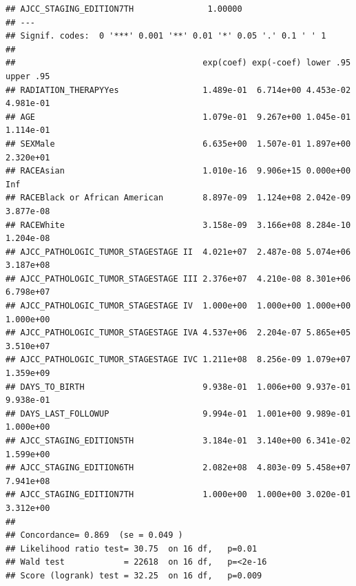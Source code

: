 \documentclass[
  11pt,
]{article}
\begin{document}
\begin{verbatim}
## AJCC_STAGING_EDITION7TH               1.00000    
## ---
## Signif. codes:  0 '***' 0.001 '**' 0.01 '*' 0.05 '.' 0.1 ' ' 1
## 
##                                      exp(coef) exp(-coef) lower .95 upper .95
## RADIATION_THERAPYYes                 1.489e-01  6.714e+00 4.453e-02 4.981e-01
## AGE                                  1.079e-01  9.267e+00 1.045e-01 1.114e-01
## SEXMale                              6.635e+00  1.507e-01 1.897e+00 2.320e+01
## RACEAsian                            1.010e-16  9.906e+15 0.000e+00       Inf
## RACEBlack or African American        8.897e-09  1.124e+08 2.042e-09 3.877e-08
## RACEWhite                            3.158e-09  3.166e+08 8.284e-10 1.204e-08
## AJCC_PATHOLOGIC_TUMOR_STAGESTAGE II  4.021e+07  2.487e-08 5.074e+06 3.187e+08
## AJCC_PATHOLOGIC_TUMOR_STAGESTAGE III 2.376e+07  4.210e-08 8.301e+06 6.798e+07
## AJCC_PATHOLOGIC_TUMOR_STAGESTAGE IV  1.000e+00  1.000e+00 1.000e+00 1.000e+00
## AJCC_PATHOLOGIC_TUMOR_STAGESTAGE IVA 4.537e+06  2.204e-07 5.865e+05 3.510e+07
## AJCC_PATHOLOGIC_TUMOR_STAGESTAGE IVC 1.211e+08  8.256e-09 1.079e+07 1.359e+09
## DAYS_TO_BIRTH                        9.938e-01  1.006e+00 9.937e-01 9.938e-01
## DAYS_LAST_FOLLOWUP                   9.994e-01  1.001e+00 9.989e-01 1.000e+00
## AJCC_STAGING_EDITION5TH              3.184e-01  3.140e+00 6.341e-02 1.599e+00
## AJCC_STAGING_EDITION6TH              2.082e+08  4.803e-09 5.458e+07 7.941e+08
## AJCC_STAGING_EDITION7TH              1.000e+00  1.000e+00 3.020e-01 3.312e+00
## 
## Concordance= 0.869  (se = 0.049 )
## Likelihood ratio test= 30.75  on 16 df,   p=0.01
## Wald test            = 22618  on 16 df,   p=<2e-16
## Score (logrank) test = 32.25  on 16 df,   p=0.009
\end{verbatim}

\newpage
\section{}
\end{document}
